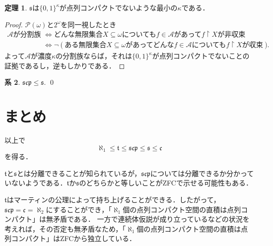 \documentclass[uplatex,dvipdfmx]{jsarticle}
\newcommand{\frakt}{\mathfrak{t}}
\newcommand{\s}{\mathfrak{s}}
\newcommand{\scp}{\mathfrak{scp}}
\renewcommand\subset{\subseteq}
\theoremstyle{definition}
\newtheorem{thm}{定理}
\newtheorem{cor}[thm]{系}
\theoremstyle{named}
\begin{document}
\begin{thm}
$\s$は$\{0, 1\}^\kappa$が点列コンパクトでないような最小の$\kappa$である．
\end{thm}
\begin{proof}
$\mathcal{P}(\omega)$と$2^\omega$を同一視したとき
\begin{align*}
\text{$\mathcal{A}$が分割族} &\iff \text{どんな無限集合$X \subset \omega$についても$f \in \mathcal{A}$があって$f \upharpoonright X$が非収束} \\
&\iff \neg (\text{ある無限集合$X \subset \omega$があってどんな$f \in \mathcal{A}$についても$f \upharpoonright X$が収束}).
\end{align*}
よって$\mathcal{A}$が濃度$\kappa$の分割族ならば，それは$\{0, 1\}^\kappa$が点列コンパクトでないことの証拠であるし，逆もしかりである．
\end{proof}

\begin{cor}
$\scp \le \s$. \qed
\end{cor}

\section{まとめ}

以上で
\[
\aleph_1 \le \frakt \le \scp \le \s \le \mathfrak{c}
\]
を得る．

$\frakt$と$\s$とは分離できることが知られているが，$\scp$については分離できるか分かっていないようである．$\frakt$か$\s$のどちらかと等しいことがZFCで示せる可能性もある．

$\frakt$はマーティンの公理によって持ち上げることができる．したがって，$\scp = \mathfrak{c} = \aleph_2$にすることができ，「$\aleph_1$個の点列コンパクト空間の直積は点列コンパクト」は無矛盾である．
一方で連続体仮説が成り立っているなどの状況を考えれば，その否定も無矛盾なため，「$\aleph_1$個の点列コンパクト空間の直積は点列コンパクト」はZFCから独立している．

\nocite{*}
\printbibliography[title=参考文献]
\end{document}
